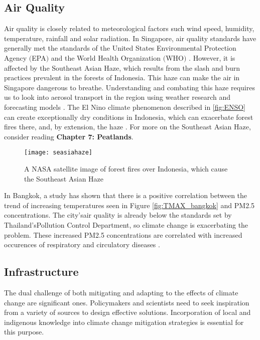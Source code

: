 \subsection{Air Quality}
Air quality is closely related to meteorological factors such wind speed, humidity, temperature, rainfall and solar radiation.  In Singapore, air quality standards have generally met the standards of the United States Environmental Protection Agency $($EPA$)$ and the World Health Organization $($WHO$)$ \citep{singaporeaq}. However, it is affected by the Southeast Asian Haze, which results from the slash and burn practices prevalent in the forests of Indonesia. This haze can make the air in Singapore dangerous to breathe. Understanding and combating this haze requires us to look into aerosol transport in the region using weather research and forecasting models \citep{singahaze}. The El Nino climate phenomenon described in \ref{fig:ENSO} can create exceptionally dry conditions in Indonesia, which can exacerbate forest fires there, and, by extension, the haze \citep{bbchaze}.   
For more on the Southeast Asian Haze, consider reading \textbf{Chapter 7: Peatlands}. 

\begin{figure}
  \texttt{[image: seasiahaze]}
  \caption{A NASA satellite image of forest fires over Indonesia, which cause the Southeast Asian Haze \citep{bbchaze}}
  \label{fig:seaasiahaze}
\end{figure}

In Bangkok, a study has shown that there is a positive correlation between the trend of increasing temperatures seen in Figure \ref{fig:TMAX_bangkok} and PM2.5 concentrations. The city'sair quality is already below the standards set by Thailand'sPollution Control Department, so climate change is exacerbating the problem. These increased PM2.5 concentrations are correlated with increased occurences of respiratory and circulatory diseases \citep{airpolchapter}. 

\subsection{Infrastructure}

The dual challenge of both mitigating and adapting to the effects of climate change are significant ones. Policymakers and scientists need to seek inspiration from a variety of sources to design effective solutions. Incorporation of local and indigenous knowledge into climate change mitigation strategies is essential for this purpose. 


